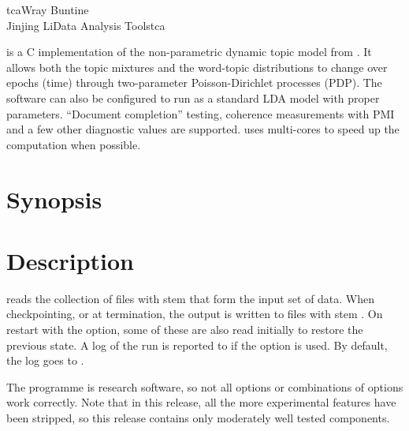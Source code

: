 \documentclass[a4paper,english]{article}
\begin{document}
\begin{Name}{1}{tca}{Wray Buntine \\ Jinjing Li}{Data Analysis Tools}{tca}

   is a C implementation of the non-parametric dynamic topic model from \citet{dtmpypwl}. It allows both the topic mixtures and the word-topic distributions to change over epochs (time) through two-parameter Poisson-Dirichlet processes (PDP). The software can also be configured to run as a standard LDA model with proper parameters. ``Document completion'' testing, coherence measurements with PMI  and a few other diagnostic values are supported.   uses multi-cores to speed up the computation when possible.


\end{Name}

\section{Synopsis}

  
                  

\section{Description}
 reads the collection of files with stem
 that form the input set of data.
When checkpointing, or at termination, the output is written
to files with stem  .
On restart with the  option, some of these
are also read initially to restore the previous state.
A log of the run is reported to  if the
 option is used.  By default, the log goes to
.

The programme is research software, so not all options
or combinations of options work correctly.
Note that in this release, all the more experimental features
have been stripped, so this release contains
only moderately well tested components.
\end{document}
